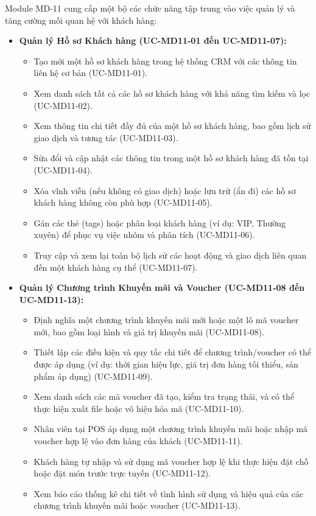 \label{sssec:md11_key_functionalities}
Module MD-11 cung cấp một bộ các chức năng tập trung vào việc quản lý và tăng cường mối quan hệ với khách hàng:

\begin{itemize}
    \item \textbf{Quản lý Hồ sơ Khách hàng (UC-MD11-01 đến UC-MD11-07):}
    \begin{itemize}
        \item Tạo mới một hồ sơ khách hàng trong hệ thống CRM với các thông tin liên hệ cơ bản (UC-MD11-01).
        \item Xem danh sách tất cả các hồ sơ khách hàng với khả năng tìm kiếm và lọc (UC-MD11-02).
        \item Xem thông tin chi tiết đầy đủ của một hồ sơ khách hàng, bao gồm lịch sử giao dịch và tương tác (UC-MD11-03).
        \item Sửa đổi và cập nhật các thông tin trong một hồ sơ khách hàng đã tồn tại (UC-MD11-04).
        \item Xóa vĩnh viễn (nếu không có giao dịch) hoặc lưu trữ (ẩn đi) các hồ sơ khách hàng không còn phù hợp (UC-MD11-05).
        \item Gán các thẻ (tags) hoặc phân loại khách hàng (ví dụ: VIP, Thường xuyên) để phục vụ việc nhóm và phân tích (UC-MD11-06).
        \item Truy cập và xem lại toàn bộ lịch sử các hoạt động và giao dịch liên quan đến một khách hàng cụ thể (UC-MD11-07).
    \end{itemize}

    \item \textbf{Quản lý Chương trình Khuyến mãi và Voucher (UC-MD11-08 đến UC-MD11-13):}
    \begin{itemize}
        \item Định nghĩa một chương trình khuyến mãi mới hoặc một lô mã voucher mới, bao gồm loại hình và giá trị khuyến mãi (UC-MD11-08).
        \item Thiết lập các điều kiện và quy tắc chi tiết để chương trình/voucher có thể được áp dụng (ví dụ: thời gian hiệu lực, giá trị đơn hàng tối thiểu, sản phẩm áp dụng) (UC-MD11-09).
        \item Xem danh sách các mã voucher đã tạo, kiểm tra trạng thái, và có thể thực hiện xuất file hoặc vô hiệu hóa mã (UC-MD11-10).
        \item Nhân viên tại POS áp dụng một chương trình khuyến mãi hoặc nhập mã voucher hợp lệ vào đơn hàng của khách (UC-MD11-11).
        \item Khách hàng tự nhập và sử dụng mã voucher hợp lệ khi thực hiện đặt chỗ hoặc đặt món trước trực tuyến (UC-MD11-12).
        \item Xem báo cáo thống kê chi tiết về tình hình sử dụng và hiệu quả của các chương trình khuyến mãi hoặc voucher (UC-MD11-13).
    \end{itemize}


\end{itemize}
